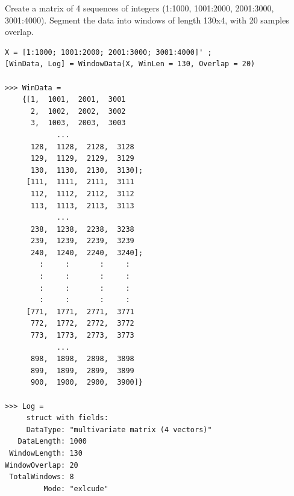 \documentclass[12pt, a4paper, titlepage, openany]{book}
\begin{document}
\newpage
\noindent Create a matrix of 4 sequences of integers (1:1000, 1001:2000, 2001:3000, 3001:4000). Segment the data into windows of length 130x4, with 20 samples overlap.
\begin{verbatim}
X = [1:1000; 1001:2000; 2001:3000; 3001:4000]' ;
[WinData, Log] = WindowData(X, WinLen = 130, Overlap = 20)

>>> WinData =
    {[1,  1001,  2001,  3001
      2,  1002,  2002,  3002
      3,  1003,  2003,  3003
            ...
      128,  1128,  2128,  3128
      129,  1129,  2129,  3129
      130,  1130,  2130,  3130];
     [111,  1111,  2111,  3111
      112,  1112,  2112,  3112
      113,  1113,  2113,  3113
            ...
      238,  1238,  2238,  3238
      239,  1239,  2239,  3239
      240,  1240,  2240,  3240];
        :     :       :     :
        :     :       :     :
        :     :       :     :
        :     :       :     :
     [771,  1771,  2771,  3771
      772,  1772,  2772,  3772
      773,  1773,  2773,  3773
            ...
      898,  1898,  2898,  3898
      899,  1899,  2899,  3899
      900,  1900,  2900,  3900]}

>>> Log =
     struct with fields:
     DataType: "multivariate matrix (4 vectors)"
   DataLength: 1000
 WindowLength: 130
WindowOverlap: 20
 TotalWindows: 8
         Mode: "exlcude"

\end{verbatim}




\newpage
\end{document}
